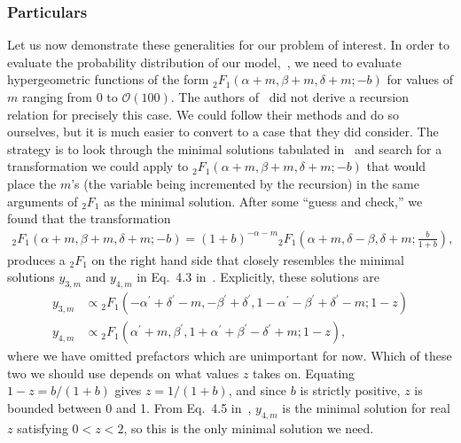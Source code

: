 \subsubsection{Particulars}
Let us now demonstrate these generalities for our problem of interest.
In order to evaluate the probability distribution of our
model,~, we need to evaluate hypergeometric functions
of the form ${_2F_1}(\alpha+m, \beta+m, \delta+m; -b)$
for values of $m$ ranging from $0$ to $\mathcal{O}(100)$.
The authors of~\cite{Gil2007} did not derive a recursion relation
for precisely this case. We could follow their methods and do so ourselves,
but it is much easier to convert to a case that they did consider.
The strategy is to look through the minimal solutions tabulated
in~\cite{Gil2007} and search for a transformation we could apply to
${_2F_1}(\alpha+m, \beta+m, \delta+m; -b)$ that would place the $m$'s
(the variable being incremented by the recursion)
in the same arguments of ${_2F_1}$ as the minimal solution.
After some ``guess and check,'' we found that the transformation
\begin{align}
{_2F_1}(\alpha+m, \beta+m, \delta+m; -b)
=
(1+b)^{-\alpha-m}
        {_2F_1}\left(\alpha+m, \delta-\beta, \delta+m; \frac{b}{1+b}\right),
\label{eq:rec_euler_pretransform}
\end{align}
produces a ${_2F_1}$ on the right hand side that closely resembles
the minimal solutions $y_{3,m}$ and $y_{4,m}$ in Eq.~4.3 in~\cite{Gil2007}.
Explicitly, these solutions are
\begin{align}
y_{3,m}
&\propto
{_2F_1}\left(-\alpha^\prime + \delta^\prime - m,
                -\beta^\prime + \delta^\prime,
                1-\alpha^\prime-\beta^\prime+\delta^\prime-m;
                1-z\right)
\\
y_{4,m}
&\propto
{_2F_1}\left(\alpha^\prime + m,
                \beta^\prime,
                1+\alpha^\prime+\beta^\prime-\delta^\prime+m;
                1-z\right),
\label{eq:minimal_soln_sans_prefac}
\end{align}
where we have omitted prefactors which are unimportant for now.
Which of these two we should use depends on what values $z$ takes on.
Equating $1-z=b/(1+b)$ gives $z=1/(1+b)$, and since $b$ is strictly positive,
$z$ is bounded between 0 and 1.
From Eq.~4.5 in~\cite{Gil2007}, $y_{4,m}$ is the minimal solution
for real $z$ satisfying $0<z<2$, so this is the only minimal solution we need.

